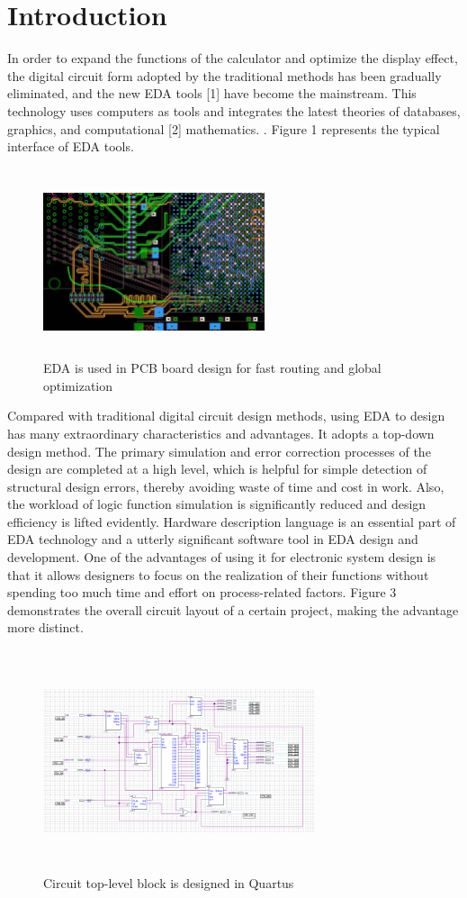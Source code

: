 \documentclass[11pt,journal,compsoc]{IEEEtran}
\begin{document}
\section{Introduction}
In order to expand the functions of the calculator and optimize the display effect, the digital circuit form adopted by the traditional methods has been gradually eliminated, and the new EDA tools [1] have become the mainstream. This technology uses computers as tools and integrates the latest theories of databases, graphics, and computational [2] mathematics. . Figure 1 represents the typical interface of EDA tools.
\begin{figure}[H]
	\centering
	\includegraphics[width=6.5cm,height=5.5cm]{fig1}
	\caption{EDA is used in PCB board design for fast routing and global optimization}
	\label{Fig1}
\end{figure}
Compared with traditional digital circuit design methods, using EDA to design has many extraordinary characteristics and advantages. It adopts a top-down design method. The primary simulation and error correction processes of the design are completed at a high level, which is helpful for simple detection of structural design errors, thereby avoiding waste of time and cost in work. Also, the workload of logic function simulation is significantly reduced and design efficiency is lifted evidently. Hardware description language is an essential part of EDA technology and a utterly significant software tool in EDA design and development. One of the advantages of using it for electronic system design is that it allows designers to focus on the realization of their functions without spending too much time and effort on process-related factors. Figure 3 demonstrates the overall circuit layout of a certain project, making the advantage more distinct.
\begin{figure}[H]
	\centering
	\includegraphics[width=8cm,height=6.5cm]{fig2}
	\caption{Circuit top-level block is designed in Quartus}
	\label{Fig2}
\end{figure}
\end{document}
